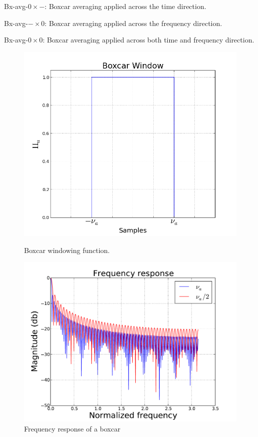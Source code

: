 \documentclass[useAMS,usenatbib]{mn2e}
\begin{document}
Bx-avg-$0\times -$: Boxcar averaging applied across the time direction.

Bx-avg-$-\times 0$: Boxcar averaging applied across the frequency direction. 

Bx-avg-$0\times 0$: Boxcar averaging applied across both time and frequency direction.
\begin{figure}
  \centering
  \begin{minipage}{0.38\linewidth}\includegraphics[width=1\textwidth]{./Figures/rect.png}\caption{Boxcar windowing 
function.}\label{fig:fig_box}\end{minipage}
\hspace{1cm}
\begin{minipage}{0.38\linewidth}\includegraphics[width=1\textwidth]{./Figures/freq_resp_box.pdf}\caption{Frequency response of a boxcar 
}
\end{minipage}
\end{figure}
\end{document}
